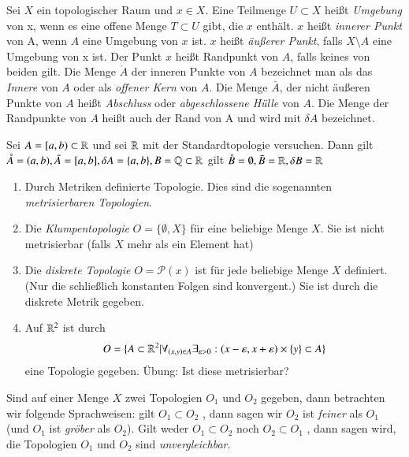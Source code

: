 \documentclass[a4paper,10pt]{scrartcl}
\newcommand{\eps}{\varepsilon}
\begin{document}
\begin{df}
Sei $ X $ ein topologischer Raum und  $x \in X $. Eine Teilmenge $ U \subset X $ heißt \emph{Umgebung} von x, wenn es eine offene Menge $ T\subset U $ gibt, die $ x $ enthält. $ x $ heißt \emph{innerer Punkt} von A, wenn $ A $ eine Umgebung von $ x $ ist. $ x $ heißt \emph{äußerer Punkt}, falls $ X\setminus A $ eine Umgebung von x ist. Der Punkt $ x $ heißt Randpunkt von $ A $, falls keines von beiden gilt.  Die Menge $ \mathring{A} $ der inneren Punkte von $ A $ bezeichnet man als das \emph{Innere} von $ A $ oder als \emph{offener Kern} von $ A $. Die Menge $ \bar A $, der nicht äußeren Punkte von $ A $ heißt \emph{Abschluss} oder \emph{abgeschlossene Hülle} von $ A $.  Die Menge der Randpunkte von $  A $  heißt auch der Rand von A und wird mit $ \delta A $ bezeichnet. 
\end{df}

\begin{ex*}
Sei $ A=[a,b)\subset \mathbb{R} $ und sei $\mathbb{R}$ mit der Standardtopologie versuchen.  Dann gilt $\mathring A=(a,b), \bar A=[a,b], \delta A=\{a,b\}, B=\mathbb{Q}\subset \mathbb{R}$ gilt $ \mathring B=\emptyset, \bar B=\mathbb{R}, \delta B=\mathbb{R} $ 
\end{ex*}
\begin{ex}\label{thm:1.13}
\begin{enumerate}
\item Durch Metriken definierte Topologie. Dies sind die sogenannten \emph{metrisierbaren Topologien}.
\item Die \emph{Klumpentopologie} $ O=\{\emptyset, X\} $ für eine beliebige Menge $ X $.  Sie ist nicht metrisierbar (falls $ X $ mehr als ein Element hat)
\item Die \emph{diskrete Topologie} $ O=\mathcal{P}(x) $ ist für jede beliebige Menge $ X $ definiert.  (Nur die schließlich konstanten Folgen sind konvergent.) Sie ist durch die diskrete Metrik gegeben.
\item Auf $\mathbb{R}^2$ ist durch
\[
O=\{A\subset \R^2|\forall_{(x,y)\in A}\exists_{\eps>0}:(x-\eps,x+\eps) \times \{y\} \subset A\}
\]
eine Topologie gegeben. Übung: Ist diese metrisierbar?
\end{enumerate}

\end{ex}

\begin{df}
Sind auf einer Menge $X$ zwei Topologien $ O_1$ und $ O_2 $ gegeben, dann betrachten wir folgende Sprachweisen: gilt $ O_1 \subset O_2 $ , dann sagen wir $ O_2 $ ist \emph{feiner} als $ O_1 $ (und $ O_1 $ ist \emph{gröber} als $ O_2 $).  Gilt weder $ O_1 \subset O_2 $ noch $ O_2\subset O_1 $ , dann sagen wird, die Topologien $ O_1 $ und $ O_2 $ sind \emph{unvergleichbar}.
\end{df}
\end{document}

